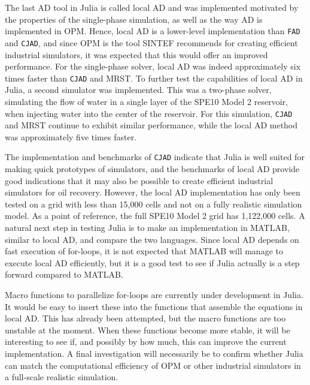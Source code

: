 The last AD tool in Julia is called local AD and was implemented motivated by the properties of the single-phase simulation, as well as the way AD is implemented in OPM. Hence, local AD is a lower-level implementation than \texttt{FAD} and \texttt{CJAD}, and since OPM is the tool SINTEF recommends for creating efficient industrial simulators, it was expected that this would offer an improved performance. For the single-phase solver, local AD was indeed approximately six times faster than \texttt{CJAD} and MRST. To further test the capabilities of local AD in Julia, a second simulator was implemented. This was a two-phase solver, simulating the flow of water in a single layer of the SPE10 Model 2 reservoir, when injecting water into the center of the reservoir. For this simulation, \texttt{CJAD} and MRST continue to exhibit similar performance, while the local AD method was approximately five times faster.

The implementation and benchmarks of \texttt{CJAD} indicate that Julia is well suited for making quick prototypes of simulators, and the benchmarks of local AD provide good indications that it may also be possible to create efficient industrial simulators for oil recovery. However, the local AD implementation has only been tested on a grid with less than 15,000 cells and not on a fully realistic simulation model. As a point of reference, the full SPE10 Model 2 grid has 1,122,000 cells. A natural next step in testing Julia is to make an implementation in MATLAB, similar to local AD, and compare the two languages. Since local AD depends on fast execution of for-loops, it is not expected that MATLAB will manage to execute local AD efficiently, but it is a good test to see if Julia actually is a step forward compared to MATLAB. 

Macro functions to parallelize for-loops are currently under development in Julia. It would be easy to insert these into the functions that assemble the equations in local AD. This has already been attempted, but the macro functions are too unstable at the moment. When these functions become more stable, it will be interesting to see if, and possibly by how much, this can improve the current implementation. A final investigation will necessarily be to confirm whether Julia can match the computational efficiency of OPM or other industrial simulators in a full-scale realistic simulation. 

